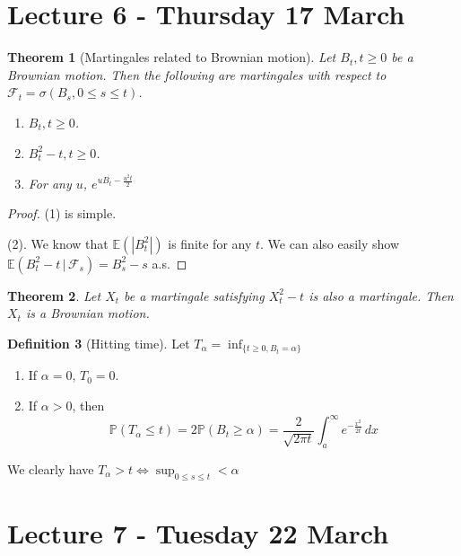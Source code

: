 \documentclass[10pt, oneside, reqno]{amsart}
\theoremstyle{plain}%
\newtheorem{thm}{Theorem}[section]
\theoremstyle{definition}
\newtheorem{defn}[thm]{Definition}
\theoremstyle{remark}
\renewcommand{\P}{\mathbb{P}}
\newcommand{\E}{\mathbb{E}}
\newcommand{\sigf}{\mathcal{F}}
\begin{document}
\section{Lecture 6 - Thursday 17 March} %
\label{sec:lecture_6_thursday_17_march}
\begin{thm}[Martingales related to Brownian motion]
    Let $B_t, t \geq 0$ be a Brownian motion.  Then the following are martingales with respect to $\sigf_t = \sigma( B_s, 0 \leq s \leq t)$.  
    \begin{enumerate}[(1)]
        \item $B_t, t \geq 0$.
        \item $B_t^2 - t, t \geq 0$.
        \item For any $u$, $e^{u B_t - \frac{u^2 t}{2}}$
    \end{enumerate}
\end{thm}
\begin{proof}
    (1) is simple.  
    
    (2).  We know that $\E( |B_t^2|)$ is finite for any $t$.  We can also easily show $\E(B_t^2 - t \, | \, \sigf_s ) = B_s^2 - s$ a.s.
\end{proof}

\begin{thm}
    Let $X_t$ be a martingale satisfying $X_t^2 - t$ is also a martingale.  Then $X_t$ is a Brownian motion.
\end{thm}

\begin{defn}[Hitting time]
    Let $T_\alpha = \inf_{\{ t \geq 0, B_t = \alpha \}}$ 
    
    \begin{enumerate}[(1)]
        \item If $\alpha = 0$, $T_0 = 0$.
        \item If $\alpha > 0$, then \[
            \P(T_\alpha \leq t) = 2 \P(B_t \geq \alpha) = \frac{2}{\sqrt{2 \pi t}} \int_a^\infty e^{-\frac{x^2}{2t}}\, dx 
        \]  
    \end{enumerate}
    
    We clearly have $T_\alpha > t \iff \sup_{ 0 \leq s \leq t} < \alpha$ 
    
\end{defn}


\section{Lecture 7 - Tuesday 22 March} %
\label{sec:lecture_7_tuesday_22_march}
\end{document}
